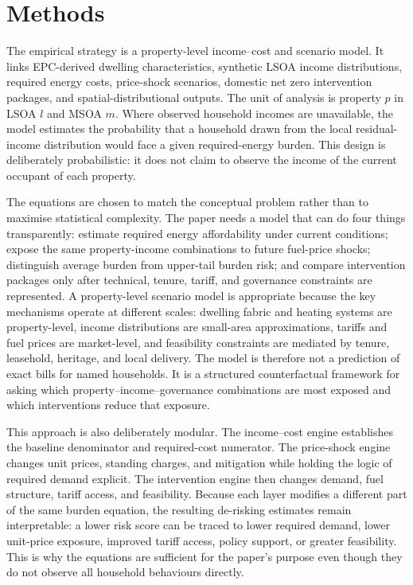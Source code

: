 \section{Methods}

The empirical strategy is a property-level income--cost and scenario model. It links EPC-derived dwelling characteristics, synthetic LSOA income distributions, required energy costs, price-shock scenarios, domestic net zero intervention packages, and spatial-distributional outputs. The unit of analysis is property $p$ in LSOA $l$ and MSOA $m$. Where observed household incomes are unavailable, the model estimates the probability that a household drawn from the local residual-income distribution would face a given required-energy burden. This design is deliberately probabilistic: it does not claim to observe the income of the current occupant of each property.

The equations are chosen to match the conceptual problem rather than to maximise statistical complexity. The paper needs a model that can do four things transparently: estimate required energy affordability under current conditions; expose the same property-income combinations to future fuel-price shocks; distinguish average burden from upper-tail burden risk; and compare intervention packages only after technical, tenure, tariff, and governance constraints are represented. A property-level scenario model is appropriate because the key mechanisms operate at different scales: dwelling fabric and heating systems are property-level, income distributions are small-area approximations, tariffs and fuel prices are market-level, and feasibility constraints are mediated by tenure, leasehold, heritage, and local delivery. The model is therefore not a prediction of exact bills for named households. It is a structured counterfactual framework for asking which property--income--governance combinations are most exposed and which interventions reduce that exposure.

This approach is also deliberately modular. The income--cost engine establishes the baseline denominator and required-cost numerator. The price-shock engine changes unit prices, standing charges, and mitigation while holding the logic of required demand explicit. The intervention engine then changes demand, fuel structure, tariff access, and feasibility. Because each layer modifies a different part of the same burden equation, the resulting de-risking estimates remain interpretable: a lower risk score can be traced to lower required demand, lower unit-price exposure, improved tariff access, policy support, or greater feasibility. This is why the equations are sufficient for the paper's purpose even though they do not observe all household behaviours directly.

